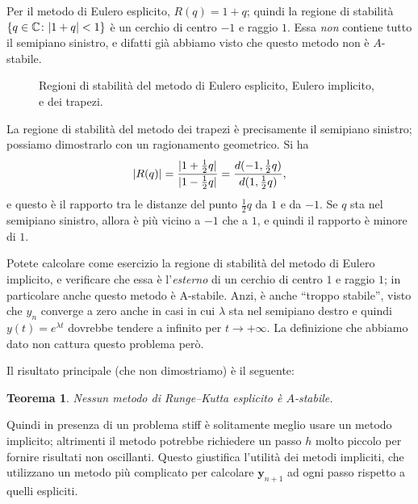 \documentclass[a4paper]{report}
\DeclarePairedDelimiter{\abs}{\lvert}{\rvert}
\newtheorem{theorem}{Teorema}[chapter]
\theoremstyle{definiton}
\theoremstyle{remark}
\newcommand{\y}{\mathbf{y}}
\begin{document}
Per il metodo di Eulero esplicito, $R(q)= 1+q$; quindi la regione di stabilità $\{q\in\mathbb{C} \colon \abs{1+q}<1\}$ è un cerchio di centro $-1$ e raggio $1$. Essa \emph{non} contiene tutto il semipiano sinistro, e difatti già abbiamo visto che questo metodo non è $A$-stabile.
\begin{figure}
    \caption{Regioni di stabilità del metodo di Eulero esplicito, Eulero implicito, e dei trapezi.}
\end{figure}

La regione di stabilità del metodo dei trapezi è precisamente il semipiano sinistro; possiamo dimostrarlo con un ragionamento geometrico. Si ha
\[
\abs{R(q)} = \frac{\abs{1+\frac12q}}{\abs{1-\frac12q}} = \frac{d(-1,\frac12q)}{d(1,\frac12q)},
\]
e questo è il rapporto tra le distanze del punto $\frac12q$ da $1$ e da $-1$. Se $q$ sta nel semipiano sinistro, allora è più vicino a $-1$ che a $1$, e quindi il rapporto è minore di $1$.


Potete calcolare come esercizio la regione di stabilità del metodo di Eulero implicito, e verificare che essa è l'\emph{esterno} di un cerchio di centro $1$ e raggio $1$; in particolare anche questo metodo è A-stabile. Anzi, è anche ``troppo stabile'', visto che $y_n$ converge a zero anche in casi in cui $\lambda$ sta nel semipiano destro e quindi $y(t) = e^{\lambda t}$ dovrebbe tendere a infinito per $t\to+\infty$. La definizione che abbiamo dato non cattura questo problema però.

Il risultato principale (che non dimostriamo) è il seguente:
\begin{theorem}
Nessun metodo di Runge--Kutta esplicito è $A$-stabile.
\end{theorem}
Quindi in presenza di un problema stiff è solitamente meglio usare un metodo implicito; altrimenti il metodo potrebbe richiedere un passo $h$ molto piccolo per fornire risultati non oscillanti. Questo giustifica l'utilità dei metodi impliciti, che utilizzano un metodo più complicato per calcolare $\y_{n+1}$ ad ogni passo rispetto a quelli espliciti.
\end{document}
